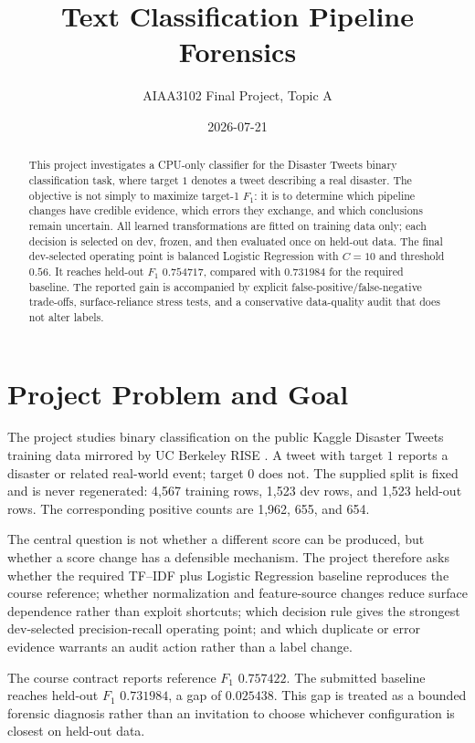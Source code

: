\documentclass[10pt]{article}
\title{Text Classification Pipeline Forensics}
\author{AIAA3102 Final Project, Topic A}
\date{2026-07-21}
\newcommand{\fscore}{\ensuremath{F_1}}
\begin{document}
\maketitle

\begin{abstract}
This project investigates a CPU-only classifier for the Disaster Tweets binary classification task, where target $1$ denotes a tweet describing a real disaster. The objective is not simply to maximize target-1 \fscore: it is to determine which pipeline changes have credible evidence, which errors they exchange, and which conclusions remain uncertain. All learned transformations are fitted on training data only; each decision is selected on dev, frozen, and then evaluated once on held-out data. The final dev-selected operating point is balanced Logistic Regression with $C=10$ and threshold $0.56$. It reaches held-out \fscore{} $0.754717$, compared with $0.731984$ for the required baseline. The reported gain is accompanied by explicit false-positive/false-negative trade-offs, surface-reliance stress tests, and a conservative data-quality audit that does not alter labels.
\end{abstract}

\section{Project Problem and Goal}

The project studies binary classification on the public Kaggle Disaster Tweets training data mirrored by UC Berkeley RISE \citep{kaggleDisasterTweets}. A tweet with target $1$ reports a disaster or related real-world event; target $0$ does not. The supplied split is fixed and is never regenerated: 4,567 training rows, 1,523 dev rows, and 1,523 held-out rows. The corresponding positive counts are 1,962, 655, and 654.

The central question is not whether a different score can be produced, but whether a score change has a defensible mechanism. The project therefore asks whether the required TF--IDF plus Logistic Regression baseline reproduces the course reference; whether normalization and feature-source changes reduce surface dependence rather than exploit shortcuts; which decision rule gives the strongest dev-selected precision-recall operating point; and which duplicate or error evidence warrants an audit action rather than a label change.

The course contract reports reference \fscore{} $0.757422$. The submitted baseline reaches held-out \fscore{} $0.731984$, a gap of $0.025438$. This gap is treated as a bounded forensic diagnosis rather than an invitation to choose whichever configuration is closest on held-out data.
\end{document}
